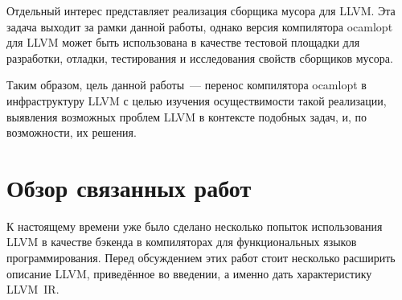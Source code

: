 \documentclass[a4paper, 12pt]{article}
\begin{document}
Отдельный интерес представляет реализация сборщика мусора для LLVM. Эта задача выходит за рамки данной работы, однако
версия компилятора ocamlopt для LLVM может быть использована в качестве тестовой площадки для разработки, отладки,
тестирования и исследования свойств сборщиков мусора.

Таким образом, цель данной работы~--- перенос компилятора ocamlopt в инфраструктуру LLVM с целью изучения
осуществимости такой реализации, выявления возможных проблем LLVM в контексте подобных задач, и, по возможности, их
решения.

\newpage
\section{Обзор связанных работ}
К настоящему времени уже было сделано несколько попыток использования LLVM в качестве бэкенда в компиляторах для
функциональных языков программирования. Перед обсуждением этих работ стоит несколько расширить описание LLVM,
приведённое во введении, а именно дать характеристику LLVM~IR.
\end{document}
